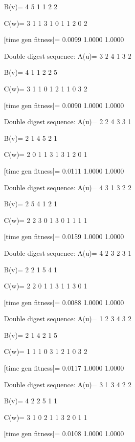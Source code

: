B(v)=
     4     5     1     1     2     2

C(w)=
     3     1     1     3     1     0     1     1     2     0     2

[time gen fitness]=
    0.0099    1.0000    1.0000

Double digest sequence:
A(u)=
     3     2     4     1     3     2

B(v)=
     4     1     1     2     2     5

C(w)=
     3     1     1     0     1     2     1     1     0     3     2

[time gen fitness]=
    0.0090    1.0000    1.0000

Double digest sequence:
A(u)=
     2     2     4     3     3     1

B(v)=
     2     1     4     5     2     1

C(w)=
     2     0     1     1     3     1     3     1     2     0     1

[time gen fitness]=
    0.0111    1.0000    1.0000

Double digest sequence:
A(u)=
     4     3     1     3     2     2

B(v)=
     2     5     4     1     2     1

C(w)=
     2     2     3     0     1     3     0     1     1     1     1

[time gen fitness]=
    0.0159    1.0000    1.0000

Double digest sequence:
A(u)=
     4     2     3     2     3     1

B(v)=
     2     2     1     5     4     1

C(w)=
     2     2     0     1     1     3     1     1     3     0     1

[time gen fitness]=
    0.0088    1.0000    1.0000

Double digest sequence:
A(u)=
     1     2     3     4     3     2

B(v)=
     2     1     4     2     1     5

C(w)=
     1     1     1     0     3     1     2     1     0     3     2

[time gen fitness]=
    0.0117    1.0000    1.0000

Double digest sequence:
A(u)=
     3     1     3     4     2     2

B(v)=
     4     2     2     5     1     1

C(w)=
     3     1     0     2     1     1     3     2     0     1     1

[time gen fitness]=
    0.0108    1.0000    1.0000

